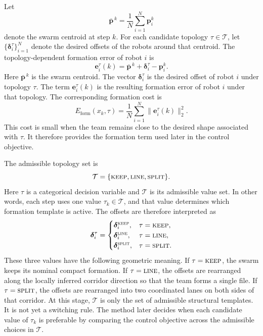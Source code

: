 \documentclass{ieeeaccess}
\newcommand{\cT}{\mathcal{T}}
\newcommand{\bfp}{\mathbf{p}}
\newcommand{\bfe}{\mathbf{e}}
\begin{document}
Let
\[
\bar{\bfp}^{\,k}=\frac{1}{N}\sum_{i=1}^N \bfp_i^k
\]
denote the swarm centroid at step $k$. For each candidate topology
$\tau\in\cT$, let
$\{\bm{\delta}_i^\tau\}_{i=1}^N$ denote the desired offsets of the
robots around that centroid. The topology-dependent formation error of
robot $i$ is
\begin{equation}
\bfe_i^\tau(k) = \bar{\bfp}^{\,k} + \bm{\delta}_i^\tau - \bfp_i^k.
\label{eq:formation_error}
\end{equation}
Here $\bar{\bfp}^{\,k}$ is the swarm centroid. The vector
$\bm{\delta}_i^\tau$ is the desired offset of robot $i$ under topology
$\tau$. The term $\bfe_i^\tau(k)$ is the resulting formation error of
robot $i$ under that topology. The corresponding formation cost is
\begin{equation}
E_{\mathrm{form}}(x_k,\tau)
= \frac{1}{N}\sum_{i=1}^N \|\bfe_i^\tau(k)\|_2^2.
\label{eq:formation_cost}
\end{equation}
This cost is small when the team remains close to the desired shape
associated with $\tau$. It therefore provides the formation term used
later in the control objective.

The admissible topology set is
\begin{equation}
\cT=\{\textsc{keep},\textsc{line},\textsc{split}\}.
\label{eq:topology_set}
\end{equation}
Here $\tau$ is a categorical decision variable and $\cT$ is its
admissible value set. In other words, each step uses one value
$\tau_k\in\cT$, and that value determines which formation template is
active. The offsets are therefore interpreted as
\begin{equation}
\bm{\delta}_i^\tau =
\begin{cases}
\bm{\delta}_i^{\textsc{keep}}, & \tau=\textsc{keep},\\
\bm{\delta}_i^{\textsc{line}}, & \tau=\textsc{line},\\
\bm{\delta}_i^{\textsc{split}}, & \tau=\textsc{split}.
\end{cases}
\label{eq:delta_by_topology}
\end{equation}
These three values have the following geometric meaning. If
$\tau=\textsc{keep}$, the swarm keeps its nominal compact formation. If
$\tau=\textsc{line}$, the offsets are rearranged along the locally
inferred corridor direction so that the team forms a single file. If
$\tau=\textsc{split}$, the offsets are rearranged into two coordinated
lanes on both sides of that corridor. At this stage, $\cT$ is only the
set of admissible structural templates. It is not yet a switching rule.
The method later decides when each candidate value of $\tau_k$ is
preferable by comparing the control objective across the admissible
choices in $\cT$.
\end{document}
